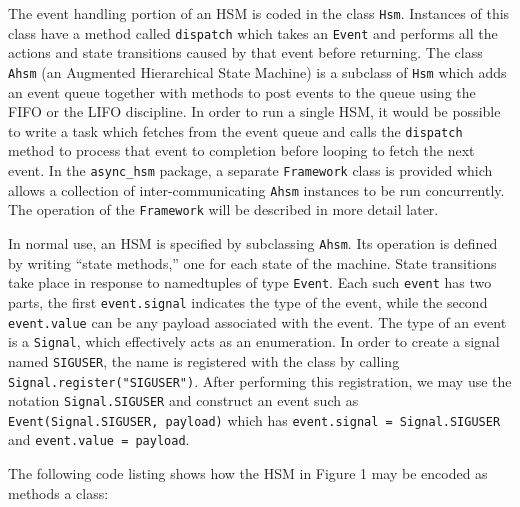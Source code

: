 \documentclass[12pt]{article}
\begin{document}
The event handling portion of an HSM is coded in the class \texttt{Hsm}. Instances of this class have a method called \texttt{dispatch} which takes an \texttt{Event} and performs all the actions and state transitions caused by that event before returning. The class \texttt{Ahsm} (an Augmented Hierarchical State Machine) is a subclass of \texttt{Hsm} which adds an event queue together with methods to post events to the queue using the FIFO or the LIFO discipline. In order to run a single HSM, it would be possible to write a task which fetches from the event queue and calls the \texttt{dispatch} method to process that event to completion before looping to fetch the next event. In the \texttt{async\_hsm} package, a separate \texttt{Framework} class is provided which allows a collection of inter-communicating \texttt{Ahsm} instances to be run concurrently. The operation of the \texttt{Framework} will be described in more detail later.

In normal use, an HSM is specified by subclassing \texttt{Ahsm}. Its operation is defined by writing ``state methods,'' one for each state of the machine. State transitions take place in response to namedtuples of type \texttt{Event}. Each such \texttt{event} has two parts, the first \texttt{event.signal} indicates the type of the event, while the second \texttt{event.value} can be any payload associated with the event. The type of an event is a \texttt{Signal}, which effectively acts as an enumeration. In order to create a signal named \texttt{SIGUSER}, the name is registered with the class by calling \texttt{Signal.register("SIGUSER")}. After performing this registration, we may use the notation \texttt{Signal.SIGUSER} and construct an event such as \texttt{Event(Signal.SIGUSER, payload)} which has \texttt{event.signal = Signal.SIGUSER} and \texttt{event.value = payload}.

The following code listing shows how the HSM in Figure 1 may be encoded as methods a class:
\end{document}
